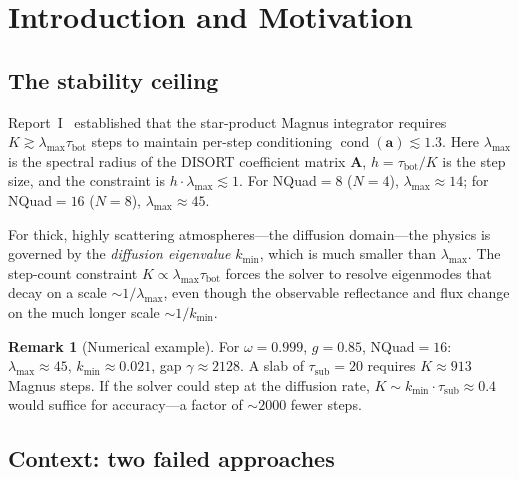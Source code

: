 \documentclass[11pt,a4paper]{article}
\newcommand{\cond}{\operatorname{cond}}
\newcommand{\mat}[1]{\mathbf{#1}}
\newcommand{\tbot}{\tau_{\mathrm{bot}}}
\newcommand{\tsub}{\tau_{\mathrm{sub}}}
\newcommand{\kmin}{k_{\min}}
\theoremstyle{definition}
\newtheorem{remark}{Remark}
\begin{document}
\tableofcontents
\vspace{1em}

\section{Introduction and Motivation}\label{sec:intro}

\subsection{The stability ceiling}

Report~I~\cite{report1} established that the star-product Magnus
integrator requires $K\gtrsim\lambda_{\max}\tbot$ steps to maintain
per-step conditioning $\cond(\mat{a})\lesssim 1.3$.  Here
$\lambda_{\max}$ is the spectral radius of the DISORT coefficient
matrix $\mat{A}$, $h=\tbot/K$ is the step size, and the constraint is
$h\cdot\lambda_{\max}\lesssim 1$.  For NQuad${}=8$ ($N\!=\!4$),
$\lambda_{\max}\approx 14$; for NQuad${}=16$ ($N\!=\!8$),
$\lambda_{\max}\approx 45$.

For thick, highly scattering atmospheres---the diffusion domain---the
physics is governed by the \emph{diffusion eigenvalue} $\kmin$, which
is much smaller than $\lambda_{\max}$.  The step-count constraint
$K\propto\lambda_{\max}\tbot$ forces the solver to resolve
eigenmodes that decay on a scale $\sim 1/\lambda_{\max}$, even though
the observable reflectance and flux change on the much longer scale
$\sim 1/\kmin$.

\begin{remark}[Numerical example]
For $\omega=0.999$, $g=0.85$, NQuad${}=16$: $\lambda_{\max}\approx 45$,
$\kmin\approx 0.021$, gap $\gamma\approx 2128$.  A slab of
$\tsub=20$ requires $K\approx 913$ Magnus steps.  If the solver
could step at the diffusion rate, $K\sim\kmin\cdot\tsub\approx 0.4$
would suffice for accuracy---a factor of ${\sim}2000$ fewer steps.
\end{remark}

\subsection{Context: two failed approaches}
\end{document}
